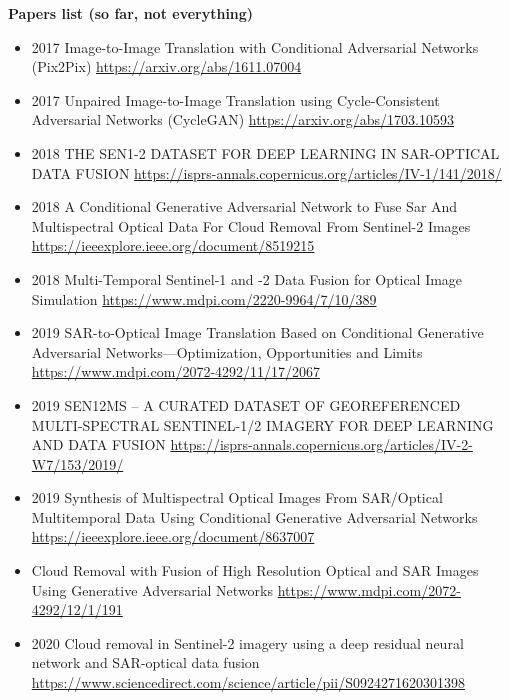 \textbf{Papers list (so far, not everything)}
\begin{itemize}
    \item 2017 Image-to-Image Translation with Conditional Adversarial Networks (Pix2Pix)
    \url{https://arxiv.org/abs/1611.07004}

    \item 2017 Unpaired Image-to-Image Translation using Cycle-Consistent Adversarial Networks (CycleGAN)
    \url{https://arxiv.org/abs/1703.10593}

    \item 2018 THE SEN1-2 DATASET FOR DEEP LEARNING IN SAR-OPTICAL DATA FUSION
    \url{https://isprs-annals.copernicus.org/articles/IV-1/141/2018/}

    \item 2018 A Conditional Generative Adversarial Network to Fuse Sar And Multispectral Optical Data For Cloud Removal From Sentinel-2 Images
    \url{https://ieeexplore.ieee.org/document/8519215}

    \item 2018 Multi-Temporal Sentinel-1 and -2 Data Fusion for Optical Image Simulation
    \url{https://www.mdpi.com/2220-9964/7/10/389}

    \item 2019 SAR-to-Optical Image Translation Based on Conditional Generative Adversarial Networks—Optimization, Opportunities and Limits
    \url{https://www.mdpi.com/2072-4292/11/17/2067}

    \item 2019 SEN12MS – A CURATED DATASET OF GEOREFERENCED MULTI-SPECTRAL SENTINEL-1/2 IMAGERY FOR DEEP LEARNING AND DATA FUSION
    \url{https://isprs-annals.copernicus.org/articles/IV-2-W7/153/2019/}

    \item 2019 Synthesis of Multispectral Optical Images From SAR/Optical Multitemporal Data Using Conditional Generative Adversarial Networks
    \url{https://ieeexplore.ieee.org/document/8637007}

    \item Cloud Removal with Fusion of High Resolution Optical and SAR Images Using Generative Adversarial Networks
    \url{https://www.mdpi.com/2072-4292/12/1/191}
    
    \item 2020 Cloud removal in Sentinel-2 imagery using a deep residual neural network and SAR-optical data fusion
    \url{https://www.sciencedirect.com/science/article/pii/S0924271620301398}


\end{itemize}
